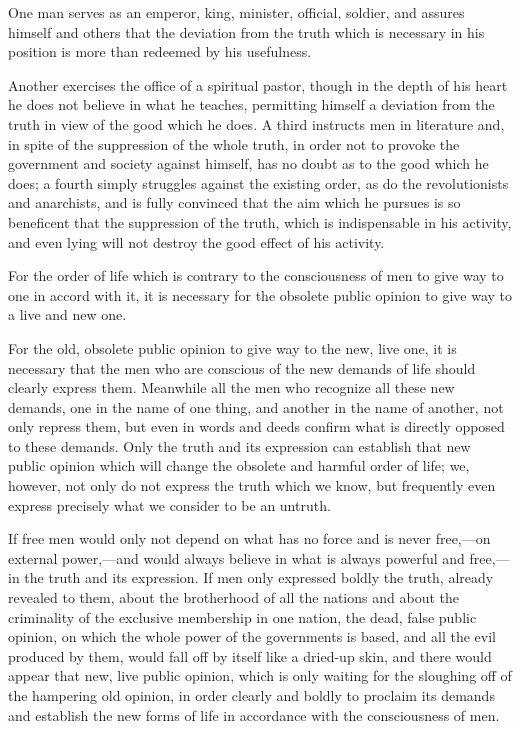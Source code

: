\documentclass{book}
\begin{document}
One man serves as an emperor, king, minister, official, soldier, and assures himself and others that the deviation from the truth which is necessary in his position is more than redeemed by his usefulness.

Another exercises the office of a spiritual pastor, though in the depth of his heart he does not believe in what he teaches, permitting himself a deviation from the truth in view of the good which he does. A third instructs men in literature and, in spite of the suppression of the whole truth, in order not to provoke the government and society against himself, has no doubt as to the good which he does; a fourth simply struggles against the existing order, as do the revolutionists and anarchists, and is fully convinced that the aim which he pursues is so beneficent that the suppression of the truth, which is indispensable in his activity, and even lying will not destroy the good effect of his activity.

For the order of life which is contrary to the consciousness of men to give way to one in accord with it, it is necessary for the obsolete public opinion to give way to a live and new one.

For the old, obsolete public opinion to give way to the new, live one, it is necessary that the men who are conscious of the new demands of life should clearly express them. Meanwhile all the men who recognize all these new demands, one in the name of one thing, and another in the name of another, not only repress them, but even in words and deeds confirm what is directly opposed to these demands. Only the truth and its expression can establish that new public opinion which will change the obsolete and harmful order of life; we, however, not only do not express the truth which we know, but frequently even express precisely what we consider to be an untruth.

If free men would only not depend on what has no force and is never free,—on external power,—and would always believe in what is always powerful and free,—in the truth and its expression. If men only expressed boldly the truth, already revealed to them, about the brotherhood of all the nations and about the criminality of the exclusive membership in one nation, the dead, false public opinion, on which the whole power of the governments is based, and all the evil produced by them, would fall off by itself like a dried-up skin, and there would appear that new, live public opinion, which is only waiting for the sloughing off of the hampering old opinion, in order clearly and boldly to proclaim its demands and establish the new forms of life in accordance with the consciousness of men.
\end{document}
